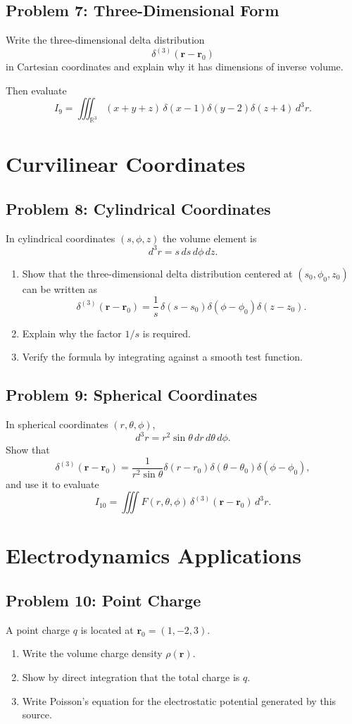 \documentclass[hidelinks]{article}
\begin{document}
\subsection{Problem 7: Three-Dimensional Form}
Write the three-dimensional delta distribution
\[
\delta^{(3)}(\mathbf{r}-\mathbf{r}_0)
\]
in Cartesian coordinates and explain why it has dimensions of inverse volume.

Then evaluate
\[
I_9=\iiint_{\mathbb{R}^3} (x+y+z)\,\delta(x-1)\delta(y-2)\delta(z+4)\,d^3r.
\]

\section{Curvilinear Coordinates}

\subsection{Problem 8: Cylindrical Coordinates}
In cylindrical coordinates $(s,\phi,z)$ the volume element is
\[
d^3r=s\,ds\,d\phi\,dz.
\]
\begin{enumerate}[label=\alph*)]
\item Show that the three-dimensional delta distribution centered at $(s_0,\phi_0,z_0)$ can be written as
\[
\delta^{(3)}(\mathbf{r}-\mathbf{r}_0)=\frac{1}{s}\,\delta(s-s_0)\delta(\phi-\phi_0)\delta(z-z_0).
\]
\item Explain why the factor $1/s$ is required.
\item Verify the formula by integrating against a smooth test function.
\end{enumerate}

\subsection{Problem 9: Spherical Coordinates}
In spherical coordinates $(r,\theta,\phi)$,
\[
d^3r=r^2\sin\theta\,dr\,d\theta\,d\phi.
\]
Show that
\[
\delta^{(3)}(\mathbf{r}-\mathbf{r}_0)=
\frac{1}{r^2\sin\theta}\delta(r-r_0)\delta(\theta-\theta_0)\delta(\phi-\phi_0),
\]
and use it to evaluate
\[
I_{10}=\iiint F(r,\theta,\phi)\,\delta^{(3)}(\mathbf{r}-\mathbf{r}_0)\,d^3r.
\]

\section{Electrodynamics Applications}

\subsection{Problem 10: Point Charge}
A point charge $q$ is located at $\mathbf{r}_0=(1,-2,3)$.
\begin{enumerate}[label=\alph*)]
\item Write the volume charge density $\rho(\mathbf{r})$.
\item Show by direct integration that the total charge is $q$.
\item Write Poisson's equation for the electrostatic potential generated by this source.
\end{enumerate}
\end{document}
